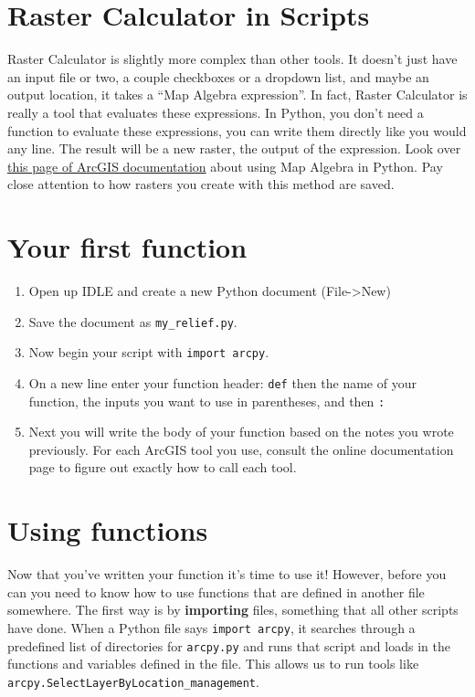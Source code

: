 \documentclass{article}
\begin{document}
\section{Raster Calculator in Scripts}
Raster Calculator is slightly more complex than other tools.  It doesn't just have an input file or two, a couple checkboxes or a dropdown list, and maybe an output location, it takes a ``Map Algebra expression''.  In fact, Raster Calculator is really a tool that evaluates these expressions.  In Python, you don't need a function to evaluate these expressions, you can write them directly like you would any line.  The result will be a new raster, the output of the expression.  Look over \href{http://desktop.arcgis.com/en/arcmap/latest/extensions/spatial-analyst/map-algebra/a-quick-tour-of-using-map-algebra.htm}{this page of ArcGIS documentation} about using Map Algebra in Python.  Pay close attention to how rasters you create with this method are saved.
\section{Your first function}
\begin{enumerate}
    \item Open up IDLE and create a new Python document (File-\textgreater New)
    \item Save the document as \verb+my_relief.py+.
    \item Now begin your script with \verb+import arcpy+.
    \item On a new line enter your function header: \verb+def+ then the name of your function, the inputs you want to use in parentheses, and then \verb+:+
    \item Next you will write the body of your function based on the notes you wrote previously.  For each ArcGIS tool you use, consult the online documentation page to figure out exactly how to call each tool. 
\end{enumerate}
\section{Using functions}

Now that you've written your function it's time to use it!  However, before you can you need to know how to use functions that are defined in another file somewhere.  The first way is by \textbf{importing} files, something that all other scripts have done.  When a Python file says \verb+import arcpy+, it searches through a predefined list of directories for \verb+arcpy.py+ and runs that script and loads in the functions and variables defined in the file.  This allows us to run tools like \verb+arcpy.SelectLayerByLocation_management+.  
\end{document}
